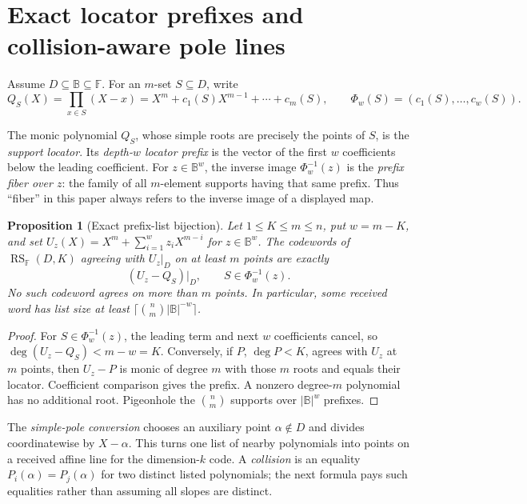 \documentclass[11pt,a4paper]{amsart}
\numberwithin{equation}{section}
\newtheorem{proposition}[proposition]{Proposition}
\theoremstyle{remark}
\DeclareMathOperator{\RS}{RS}
\newcommand{\F}{\mathbb F}
\newcommand{\B}{\mathbb B}
\newcommand{\abs}[1]{\lvert #1\rvert}
\begin{document}
\section{Exact locator prefixes and collision-aware pole lines}
\label{sec:exact-prefix-pole}

Assume \(D\subseteq\B\subseteq\F\).  For an \(m\)-set \(S\subseteq D\),
write
\[
 Q_S(X)=\prod_{x\in S}(X-x)
       =X^m+c_1(S)X^{m-1}+\cdots+c_m(S),
 \qquad
 \Phi_w(S)=(c_1(S),\ldots,c_w(S)).
\]

The monic polynomial \(Q_S\), whose simple roots are precisely the points
of \(S\), is the \emph{support locator}.  Its \emph{depth-\(w\) locator
prefix} is the vector of the first \(w\) coefficients below the leading
coefficient.  For \(z\in\B^w\), the inverse image
\(\Phi_w^{-1}(z)\) is the \emph{prefix fiber over \(z\)}: the family of
all \(m\)-element supports having that same prefix.  Thus ``fiber'' in this
paper always refers to the inverse image of a displayed map.

\begin{proposition}[Exact prefix-list bijection]\label{prop:exact-prefix-list}
Let \(1\le K\le m\le n\), put \(w=m-K\), and set
\(U_z(X)=X^m+\sum_{i=1}^wz_iX^{m-i}\) for \(z\in\B^w\).  The codewords of
\(\RS_\F(D,K)\) agreeing with \(U_z|_D\) on at least \(m\) points are
exactly
\[
        (U_z-Q_S)|_D,\qquad S\in\Phi_w^{-1}(z).
 \tag{4.1}\label{eq:prefix-bijection}
\]
No such codeword agrees on more than \(m\) points.  In particular, some
received word has list size at least
\(\lceil\binom nm\abs\B^{-w}\rceil\).
\end{proposition}

\begin{proof}
For \(S\in\Phi_w^{-1}(z)\), the leading term and next \(w\) coefficients
cancel, so \(\deg(U_z-Q_S)<m-w=K\).  Conversely, if \(P\), \(\deg P<K\),
agrees with \(U_z\) at \(m\) points, then \(U_z-P\) is monic of degree
\(m\) with those \(m\) roots and equals their locator.  Coefficient
comparison gives the prefix.  A nonzero degree-\(m\) polynomial has no
additional root.  Pigeonhole the \(\binom nm\) supports over
\(\abs\B^w\) prefixes.
\end{proof}

The \emph{simple-pole conversion} chooses an auxiliary point
\(\alpha\notin D\) and divides coordinatewise by \(X-\alpha\).  This
turns one list of nearby polynomials into points on a received affine line
for the dimension-\(k\) code.  A \emph{collision} is an equality
\(P_i(\alpha)=P_j(\alpha)\) for two distinct listed polynomials; the next
formula pays such equalities rather than assuming all slopes are distinct.
\end{document}
